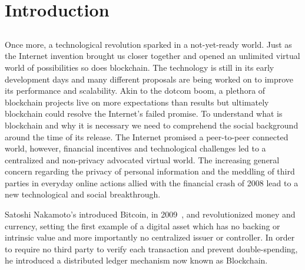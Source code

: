 \chapter{Introduction} \label{chap:intro}

\section*{}



Once more, a technological revolution sparked in a not-yet-ready world. Just as the Internet invention brought us closer together and opened an unlimited virtual world of possibilities so does blockchain. The technology is still in its early development days and many different proposals are being worked on to improve its performance and scalability. Akin to the dotcom boom, a plethora of blockchain projects live on more expectations than results but ultimately blockchain could resolve the Internet's failed promise. To understand what is blockchain and why it is necessary we need to comprehend the social background around the time of its release. The Internet promised a peer-to-peer connected world, however, financial incentives and technological challenges led to a centralized and non-privacy advocated virtual world. The increasing general concern regarding the privacy of personal information and the meddling of third parties in everyday online actions allied with the financial crash of 2008 lead to a new technological and social breakthrough.

Satoshi Nakamoto's introduced Bitcoin, in 2009~\citet{Nakamoto2009}, and revolutionized money and currency, setting the first example of a digital asset which has no backing or intrinsic value and more importantly no centralized issuer or controller. In order to require no third party to verify each transaction and prevent double-spending, he introduced a distributed ledger mechanism now known as Blockchain.



